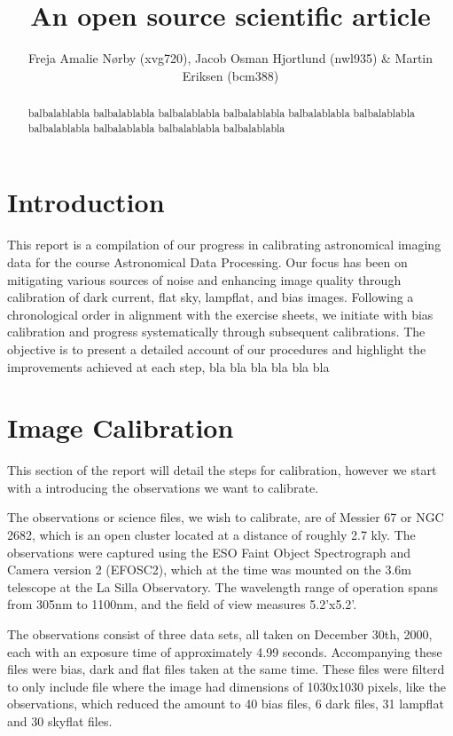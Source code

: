 \documentclass[twocolumn]{aastex631}
\begin{document}
\title{An open source scientific article}

\author{{Freja Amalie Nørby (xvg720), Jacob Osman Hjortlund (nwl935) \& Martin Eriksen (bcm388)}}


\begin{abstract}
    balbalablabla balbalablabla balbalablabla balbalablabla balbalablabla balbalablabla balbalablabla balbalablabla balbalablabla balbalablabla
\end{abstract}

\section{Introduction}
\label{sec:intro}

This report is a compilation of our progress in calibrating astronomical imaging data for the course Astronomical Data Processing. Our focus has been on mitigating various sources of noise and enhancing image quality through calibration of dark current, flat sky, lampflat, and bias images. Following a chronological order in alignment with the exercise sheets, we initiate with bias calibration and progress systematically through subsequent calibrations. The objective is to present a detailed account of our procedures and highlight the improvements achieved at each step, bla bla bla   bla bla bla 


\section{Image Calibration}
\label{sec:im_cal}

This section of the report will detail the steps for calibration, however we start with a introducing the observations we want to calibrate.

The observations or science files, we wish to calibrate, are of Messier 67 or NGC 2682, which is an open cluster located at a distance of roughly 2.7 kly. The observations were captured using the ESO Faint Object Spectrograph and Camera version 2 (EFOSC2), which at the time was mounted on the 3.6m telescope at the La Silla Observatory. The wavelength range of operation spans from 305nm to 1100nm, and the field of view measures 5.2'x5.2'. 

The observations consist of three data sets, all taken on December 30th, 2000, each with an exposure time of approximately 4.99 seconds. Accompanying these files were bias, dark and flat files taken at the same time. These files were filterd to only include file where the image had dimensions of 1030x1030 pixels, like the observations, which reduced the amount to 40 bias files, 6 dark files, 31 lampflat and 30 skyflat files. 
\end{document}
